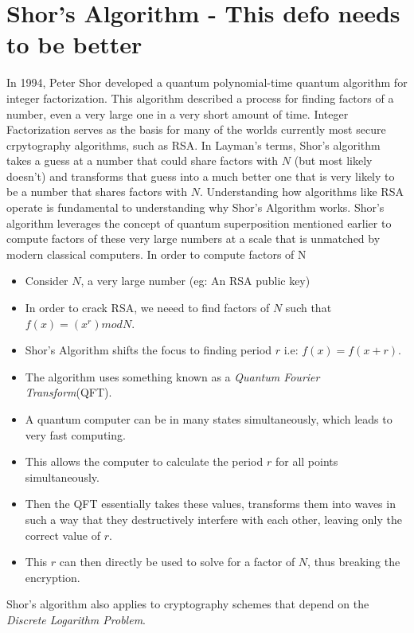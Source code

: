 \documentclass[journal]{IEEEtran}
\begin{document}
\section{Shor's Algorithm - This defo needs to be better}
In 1994, Peter Shor developed a quantum polynomial-time quantum algorithm for integer factorization. This algorithm 
described a process for finding factors of a number, even a very large one in a very short amount of time. Integer Factorization
serves as the basis for many of the worlds currently most secure crpytography algorithms, such as RSA. In Layman's terms, Shor's algorithm takes
a guess at a number that could share factors with $N$ (but most likely doesn't) and transforms that guess into a much better one
that is very likely to be a number that shares factors with $N$. Understanding how algorithms like RSA operate is fundamental to understanding why Shor's Algorithm works.
Shor's algorithm leverages the concept of quantum superposition mentioned earlier to
compute factors of these very large numbers at a scale that is unmatched by modern classical computers. In order to compute factors of N
\begin{itemize}
  \item Consider $N$, a very large number (eg: An RSA public key)
  \item In order to crack RSA, we neeed to find factors of $N$ such that $f(x)=(x^r) mod N$.
  \item Shor's Algorithm shifts the focus to finding period $r$ i.e: $f(x)=f(x+r)$. 
  \item The algorithm uses something known as a \emph{Quantum Fourier Transform}(QFT).
  \item A quantum computer can be in many states simultaneously, which leads to very fast computing.
  \item This allows the computer to calculate the period $r$ for all points simultaneously.
  \item 
  Then the QFT essentially takes these values, transforms them into waves in such a way that they 
  destructively interfere with each other, leaving only the correct value of $r$.
  \item This $r$ can then directly be used to solve for a factor of $N$, thus breaking the encryption.
\end{itemize}
Shor's algorithm also applies to cryptography schemes that depend on the \emph{Discrete Logarithm Problem}.
\end{document}
